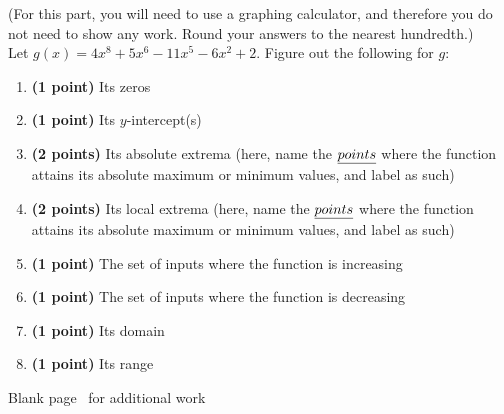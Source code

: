 \begin{tcolorbox}[colback=white,colframe=black,opacityframe=0,colbacktitle=black,title={\textbf{Problem 4 [\examproblemweight\ points]}}]
(For this part, you will need to use a graphing calculator, and therefore you do not need to show any work. Round your answers to the nearest hundredth.) \\

Let $g(x) = 4x^{8}+5x^{6}-11x^{5}-6x^{2}+2$. Figure out the following for $g$:
\begin{enumerate}[label=(\alph*)]
	\item \textbf{(1 point)} Its zeros
	\item \textbf{(1 point)} Its $y$-intercept(s)
	\item \textbf{(2 points)} Its absolute extrema (here, name the $\emph{points}$ where the function attains its absolute maximum or minimum values, and label as such)
	\item \textbf{(2 points)} Its local extrema (here, name the $\emph{points}$ where the function attains its absolute maximum or minimum values, and label as such)
	\item \textbf{(1 point)} The set of inputs where the function is increasing
	\item \textbf{(1 point)} The set of inputs where the function is decreasing
	\item \textbf{(1 point)} Its domain
	\item \textbf{(1 point)} Its range
\end{enumerate}

\end{tcolorbox}

\newpage
\noindent \centering Blank page \thepage~for additional work
\newpage
